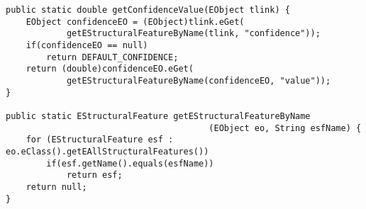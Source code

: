 
\begin{lstlisting}[caption={EMFHelper: reflection excerpt for the integration of a confidence value into Capra's \texttt{Connection} interface},
label=lst:emfhelper,
style=mystylexcore,
frame=shadowbox, 
rulesepcolor=\color{blue},
morekeywords={class,contains,abstract,extends,\{,\},\[,\],refers,derived,String,get,int,double,List,Connection,EObject,void,String,boolean,Collection,EClass,EStructuralFeature,return,null,private,static,public,double,for,if},
linewidth=17cm,
xleftmargin=0.3cm
]
public static double getConfidenceValue(EObject tlink) {
    EObject confidenceEO = (EObject)tlink.eGet(
            getEStructuralFeatureByName(tlink, "confidence"));
    if(confidenceEO == null)
        return DEFAULT_CONFIDENCE;
    return (double)confidenceEO.eGet(
            getEStructuralFeatureByName(confidenceEO, "value"));
}

public static EStructuralFeature getEStructuralFeatureByName
                                        (EObject eo, String esfName) {
    for (EStructuralFeature	esf : eo.eClass().getEAllStructuralFeatures()) 
        if(esf.getName().equals(esfName)) 
            return esf;
    return null;
}
\end{lstlisting}




